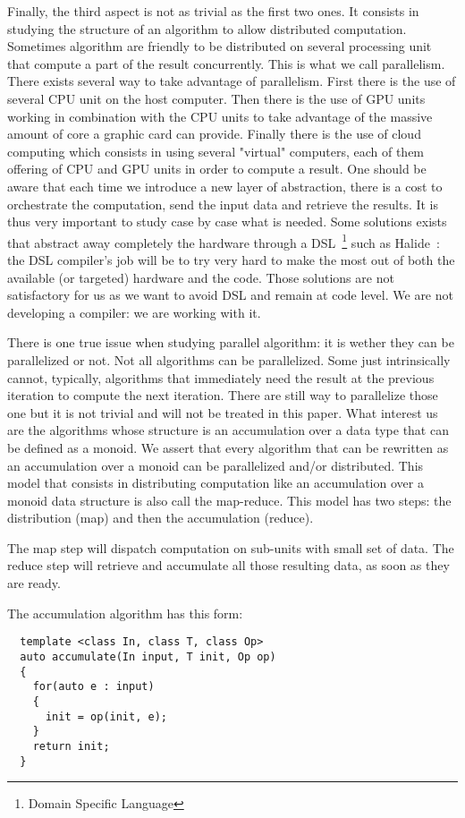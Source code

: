 Finally, the third aspect is not as trivial as the first two ones. It consists in studying the structure of an algorithm
to allow distributed computation. Sometimes algorithm are friendly to be distributed on several processing unit that
compute a part of the result concurrently. This is what we call parallelism. There exists several way to take advantage
of parallelism. First there is the use of several CPU unit on the host computer. Then there is the use of GPU units
working in combination with the CPU units to take advantage of the massive amount of core a graphic card can provide.
Finally there is the use of cloud computing which consists in using several "virtual" computers, each of them offering
of CPU and GPU units in order to compute a result. One should be aware that each time we introduce a new layer of
abstraction, there is a cost to orchestrate the computation, send the input data and retrieve the results. It is thus
very important to study case by case what is needed. Some solutions exists that abstract away completely the hardware
through a DSL~\footnote{Domain Specific Language} such as Halide~\cite{ragankelley.2013.halide}: the DSL compiler's job
will be to try very hard to make the most out of both the available (or targeted) hardware and the code. Those solutions
are not satisfactory for us as we want to avoid DSL and remain at code level. We are not developing a compiler: we are
working with it.

There is one true issue when studying parallel algorithm: it is wether they can be parallelized or not. Not all
algorithms can be parallelized. Some just intrinsically cannot, typically, algorithms that immediately need the result
at the previous iteration to compute the next iteration. There are still way to parallelize those one but it is not
trivial and will not be treated in this paper. What interest us are the algorithms whose structure is an accumulation
over a data type that can be defined as a monoid. We assert that every algorithm that can be rewritten as an
accumulation over a monoid can be parallelized and/or distributed. This model that consists in distributing computation
like an accumulation over a monoid data structure is also call the map-reduce. This model has two steps: the
distribution (map) and then the accumulation (reduce).

The map step will dispatch computation on sub-units with small set of data. The reduce step will retrieve and accumulate
all those resulting data, as soon as they are ready.

The accumulation algorithm has this form:
\begin{verbatim}
  template <class In, class T, class Op>
  auto accumulate(In input, T init, Op op)
  {
    for(auto e : input)
    {
      init = op(init, e);
    }
    return init;
  }
\end{verbatim}

